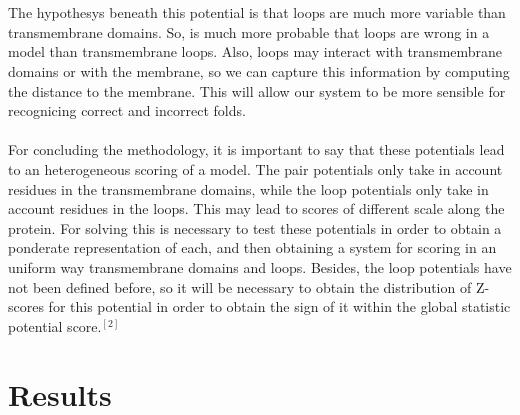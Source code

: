 \documentclass[12pt,titlepage]{article}
\theoremstyle{supercalifragilisticexpialidocious}
\begin{document}
\\ \\
The hypothesys beneath this potential is that loops are much more variable than transmembrane domains. So, is much more probable that loops are wrong in a model than transmembrane loops. Also, loops may interact with transmembrane domains or with the membrane, so we can capture this information by computing the distance to the membrane. This will allow our system to be more sensible for recognicing correct and incorrect folds.
\\ \\
For concluding the methodology, it is important to say that these potentials lead to an heterogeneous scoring of a model. The pair potentials only take in account residues in the transmembrane domains, while the loop potentials only take in account residues in the loops. This may lead to scores of different scale along the protein. For solving this is necessary to test these potentials in order to obtain a ponderate representation of each, and then obtaining a system for scoring in an uniform way transmembrane domains and loops. Besides, the loop potentials have not been defined before, so it will be necessary to obtain the distribution of Z-scores for this potential in order to obtain the sign of it within the global statistic potential score.$^{[2]}$


\section{Results }
\end{document}

